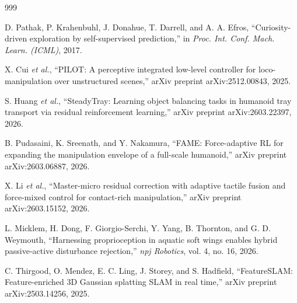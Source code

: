 \documentclass[11pt,a4paper]{article}
\begin{document}
\begin{thebibliography}{999}

D. Pathak, P. Krahenbuhl, J. Donahue, T. Darrell, and A. A. Efros, ``Curiosity-driven exploration by self-supervised prediction,'' in \textit{Proc. Int. Conf. Mach. Learn. (ICML)}, 2017.












X. Cui \textit{et al.}, ``{PILOT}: A perceptive integrated low-level controller for loco-manipulation over unstructured scenes,'' arXiv preprint arXiv:2512.00843, 2025.




S. Huang \textit{et al.}, ``{SteadyTray}: Learning object balancing tasks in humanoid tray transport via residual reinforcement learning,'' arXiv preprint arXiv:2603.22397, 2026.




B. Pudasaini, K. Sreenath, and Y. Nakamura, ``{FAME}: Force-adaptive RL for expanding the manipulation envelope of a full-scale humanoid,'' arXiv preprint arXiv:2603.06887, 2026.




X. Li \textit{et al.}, ``Master-micro residual correction with adaptive tactile fusion and force-mixed control for contact-rich manipulation,'' arXiv preprint arXiv:2603.15152, 2026.




L. Micklem, H. Dong, F. Giorgio-Serchi, Y. Yang, B. Thornton, and G. D. Weymouth, ``Harnessing proprioception in aquatic soft wings enables hybrid passive-active disturbance rejection,'' \textit{npj Robotics}, vol. 4, no. 16, 2026.




C. Thirgood, O. Mendez, E. C. Ling, J. Storey, and S. Hadfield, ``{FeatureSLAM}: Feature-enriched {3D} Gaussian splatting {SLAM} in real time,'' arXiv preprint arXiv:2503.14256, 2025.





\end{thebibliography}
\end{document}
